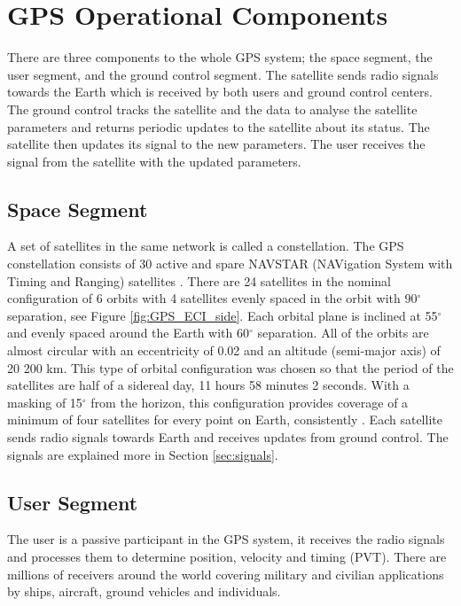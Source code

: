 

\section{GPS Operational Components}
There are three components to the whole GPS system; the space segment, the user segment, and the ground control segment. The satellite sends radio signals towards the Earth which is received by both users and ground control centers. The ground control tracks the satellite and the data to analyse the satellite parameters and returns periodic updates to the satellite about its status. The satellite then updates its signal to the new parameters. The user receives the signal from the satellite with the updated parameters.

\subsection{Space Segment}
A set of satellites in the same network is called a constellation. The GPS constellation consists of 30 active and spare NAVSTAR (NAVigation System with Timing and Ranging) satellites \cite{navpedia_spaceseg}. There are 24 satellites in the nominal configuration of 6 orbits with 4 satellites evenly spaced in the orbit with 90$^\circ$ separation, see Figure \ref{fig:GPS_ECI_side}. Each orbital plane is inclined at 55$^\circ$ and evenly spaced around the Earth with 60$^\circ$ separation. All of the orbits are almost circular with an eccentricity of 0.02 and an altitude (semi-major axis) of 20 200 km. This type of orbital configuration was chosen so that the period of the satellites are half of a sidereal day, 11 hours 58 minutes 2 seconds. With a masking of 15$^\circ$ from the horizon, this configuration provides coverage of a minimum of four satellites for every point on Earth, consistently \cite{understandinggps_ss}. Each satellite sends radio signals towards Earth and receives updates from ground control. The signals are explained more in Section \ref{sec:signals}.





\subsection{User Segment}
The user is a passive participant in the GPS system, it receives the radio signals and processes them to determine position, velocity and timing (PVT). There are millions of receivers around the world covering military and civilian applications by ships, aircraft, ground vehicles and individuals.

